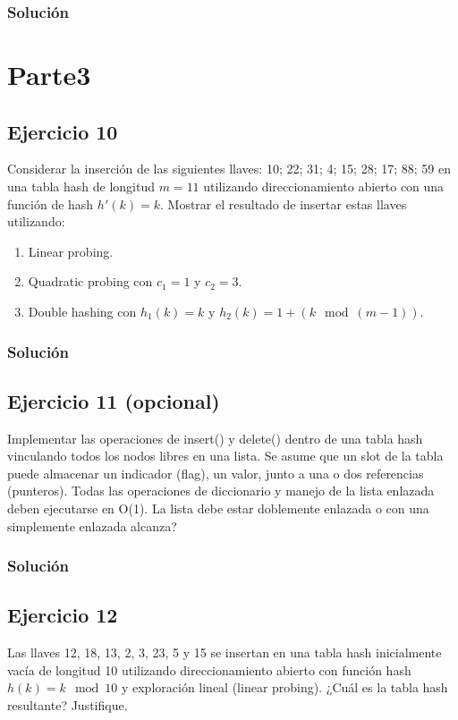 \documentclass{article}
\begin{document}
\subsubsection*{Solución}


\section*{Parte3}
\subsection*{Ejercicio 10}
Considerar la inserción de las siguientes llaves: 10; 22; 31; 4; 15; 28; 17; 88; 59 en una tabla hash de longitud $m = 11$ utilizando direccionamiento abierto con una función de hash $h'(k) = k$. Mostrar el resultado de insertar estas llaves utilizando:
\begin{enumerate}
    \item Linear probing.
    \item Quadratic probing con $c_1 = 1$ y $c_2 = 3$.
    \item Double hashing con $h_1(k) = k$ y $h_2(k) = 1 +(k \mod ( m - 1))$.
\end{enumerate}
\subsubsection*{Solución}


\subsection*{Ejercicio 11 (opcional)}
Implementar las operaciones de insert() y delete() dentro de una tabla hash vinculando todos los nodos libres en una lista. Se asume que un slot de la tabla puede almacenar un indicador (flag), un valor, junto a una o dos referencias (punteros). Todas las operaciones de diccionario y manejo de la lista enlazada deben ejecutarse en O(1). La lista debe estar doblemente enlazada o con una simplemente enlazada alcanza?
\subsubsection*{Solución}


\subsection*{Ejercicio 12}
Las llaves 12, 18, 13, 2, 3, 23, 5 y 15 se insertan en una tabla hash inicialmente vacía de longitud 10 utilizando direccionamiento abierto con función hash $h(k) = k \mod 10$ y exploración lineal (linear probing). ¿Cuál es la tabla hash resultante? Justifique.
\end{document}
